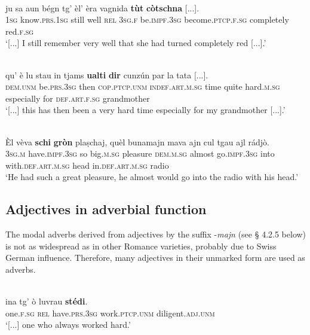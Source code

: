 \ea
{}\\
\gll    [...] ju sa aun bégn tg’ èl’ èra vagnida \textbf{tùt} \textbf{còtschna} [...].\\
{} \textsc{1sg} know.\textsc{prs.1sg} still well \textsc{rel} \textsc{3sg.f} be.\textsc{impf.3sg} become.\textsc{ptcp.f.sg} completely red.\textsc{f.sg} \\
\glt `[...] I still remember very well that she had turned completely red [...].'
\z

\ea
{}\\
\gll [...] qu’ è lu stau in tjams \textbf{ualti} \textbf{dir} cunzún par la tata [...]. \\
{} \textsc{dem.unm} be.\textsc{prs.3sg} then \textsc{cop.ptcp.unm} \textsc{indef.art.m.sg} time quite hard.\textsc{m.sg} especially for \textsc{def.art.f.sg} grandmother \\
\glt `[...] this has then been a very hard time especially for my grandmother [...].'
\z

\ea

\\
\gll    Èl vèva \textbf{schi} \textbf{gròn} plaṣchaj, quèl bunamajn mava ajn cul tgau ajl rádjò.\\
\textsc{3sg.m} have.\textsc{impf.3sg} so big.\textsc{m.sg} pleasure \textsc{dem.m.sg} almost go.\textsc{impf.3sg} into with.\textsc{def.art.m.sg} head in.\textsc{def.art.m.sg} radio\\
\glt `He had such a great pleasure, he almost would go into the radio with his head.'
\z


\subsection{Adjectives in adverbial function}
The modal adverbs derived from adjectives by the suffix -\textit{majn} (see § 4.2.5 below) is not as widespread as in other Romance varieties, probably due to Swiss German influence. Therefore, many adjectives in their unmarked form are used as adverbs.

\ea
{}\\
\gll [...] ina tg’ ò luvrau \textbf{stédi}.\\
{} one.\textsc{f.sg} \textsc{rel} have.\textsc{prs.3sg} work.\textsc{ptcp.unm} diligent.\textsc{adj.unm} \\
\glt `[...] one who always worked hard.'
\z

